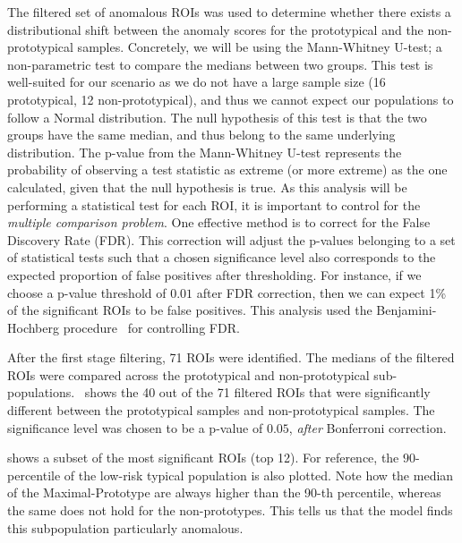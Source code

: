 The filtered set of anomalous ROIs was used to determine whether there exists a distributional shift between the anomaly scores for the prototypical and the non-prototypical samples. Concretely, we will be using the Mann-Whitney U-test; a non-parametric test to compare the medians between two groups. This test is well-suited for our scenario as we do not have a large sample size (16 prototypical, 12 non-prototypical), and thus we cannot expect our populations to follow a Normal distribution. The null hypothesis of this test is that the two groups have the same median, and thus belong to the same underlying distribution. The p-value from the Mann-Whitney U-test represents the probability of observing a test statistic as extreme (or more extreme) as the one calculated, given that the null hypothesis is true. As this analysis will be performing a statistical test for each ROI, it is important to control for the \textit{multiple comparison problem}. One effective method is to correct for the False Discovery Rate (FDR). This correction will adjust the p-values belonging to a set of statistical tests such that a chosen significance level also corresponds to the expected proportion of false positives after thresholding. For instance, if we choose a p-value threshold of $0.01$ after FDR correction, then we can expect 1\% of the significant ROIs to be false positives. This analysis used the Benjamini-Hochberg procedure~\cite{benjamini1995controlling} for controlling FDR.


After the first stage filtering, 71 ROIs were identified. The medians of the filtered ROIs were compared across the prototypical and non-prototypical sub-populations.~ shows the 40 out of the 71 filtered ROIs that were significantly different between the prototypical samples and non-prototypical samples. The significance level was chosen to be a p-value of $0.05$, \textit{after} Bonferroni correction.

 shows a subset of the  most significant ROIs (top 12). For reference, the $90$-percentile of the low-risk typical population is also plotted. Note how the median of the Maximal-Prototype are always higher than the 90-th percentile, whereas the same does not hold for the non-prototypes. This tells us that the model finds this subpopulation particularly anomalous.



